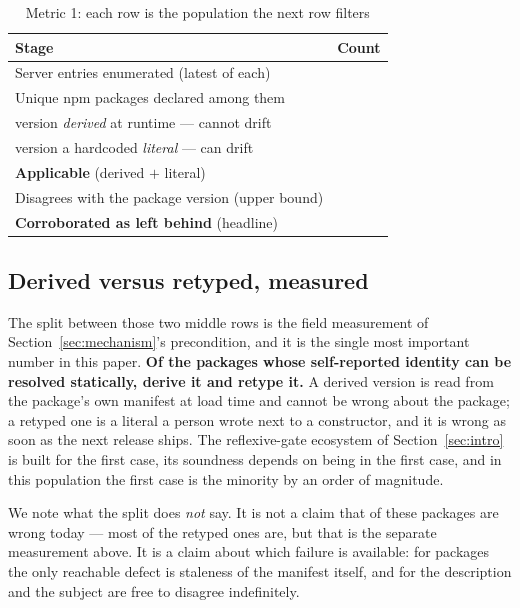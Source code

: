 \documentclass[10pt,journal,compsoc]{IEEEtran}
\begin{document}
\begin{table}[t]
\caption{Metric 1: each row is the population the next row filters}
\label{tab:ecofunnel}
\centering\footnotesize
\begin{tabular}{@{}lr@{}}
\toprule
\textbf{Stage} & \textbf{Count} \\
\midrule
Server entries enumerated (latest of each) & \factEcoServers{} \\
Unique npm packages declared among them & \factEcoPackages{} \\
\quad version \emph{derived} at runtime --- cannot drift & \factEcoDerived{} \\
\quad version a hardcoded \emph{literal} --- can drift & \factEcoRetyped{} \\
\textbf{Applicable} (derived $+$ literal) & \textbf{\factEcoApplicable{}} \\
\midrule
Disagrees with the package version (upper bound) & \factEcoDriftRaw{} \\
\textbf{Corroborated as left behind} (headline) & \textbf{\factEcoDriftConfirmed{}} \\
\bottomrule
\end{tabular}
\end{table}

\subsection{Derived versus retyped, measured}

The split between those two middle rows is the field measurement of
Section~\ref{sec:mechanism}'s precondition, and it is the single most important number in this
paper. \textbf{Of the packages whose self-reported identity can be resolved statically,
\factEcoDerivedPct{} derive it and \factEcoRetypedPct{} retype it.} A derived version is read
from the package's own manifest at load time and cannot be wrong about the package; a retyped
one is a literal a person wrote next to a constructor, and it is wrong as soon as the next
release ships. The reflexive-gate ecosystem of Section~\ref{sec:intro} is built for the first
case, its soundness depends on being in the first case, and in this population the first case
is the minority by an order of magnitude.

We note what the split does \emph{not} say. It is not a claim that
\factEcoRetypedPct{} of these packages are wrong today --- most of the retyped ones are, but
that is the separate measurement above. It is a claim about which failure is available: for
\factEcoDerived{} packages the only reachable defect is staleness of the manifest itself, and
for \factEcoRetyped{} the description and the subject are free to disagree indefinitely.
\end{document}
